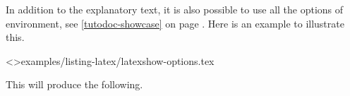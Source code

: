 \documentclass{tutodoc}
\begin{document}
\begin{tdocexa}
    In addition to the explanatory text, it is also possible to use all the options of  environment, see \ref{tutodoc-showcase} on page \pageref{tutodoc-showcase}.
    Here is an example to illustrate this.

    \medskip

    \tdoclatexinput<>{examples/listing-latex/latexshow-options.tex}

    \smallskip

    This will produce the following.

    \smallskip

    
\end{tdocexa}
\end{document}
